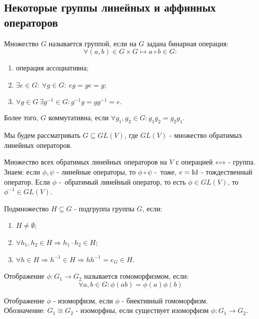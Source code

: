 \subsection{Некоторые группы линейных и аффинных операторов}
\begin{definition}
    Множество $G$ называется группой, если на $G$ задана бинарная операция:
    \[\forall (a,b) \in G \times G \longmapsto  a \circ b \in G:\]
    \begin{enumerate}
        \item операция ассоциативна;
        \item $\exists e \in G: \ \forall g \in G: \ eg = ge = g$;
        \item $\forall g \in G \ \exists g^{-1} \in G: g^{-1}g = gg^{-1} = e.$
    \end{enumerate}
    Более того, $G$ коммутативна, если $\forall g_1, g_2 \in G: g_1g_2 = g_2g_1$.
\end{definition}
Мы будем рассматривать $G \subseteq GL(V)$, где $GL(V)$ - множество обратимых линейных операторов.
\begin{example1}
    Множество всех обратимых линейных операторов на $V$ с операцией «$\circ$» - группа.\\
    Знаем: если $\phi, \psi$ - линейные операторы, то $\phi \circ \psi$ - тоже, $e = \textup{Id}$ - тождественный оператор. Если $\phi$ - обратимый линейный оператор, то есть $\phi \in GL(V)$, то $\phi^{-1} \in GL(V)$.
\end{example1}
\begin{definition}
    Подмножество $H \subseteq G$ - подгруппа группы $G$, если:
    \begin{enumerate}
        \item $H \neq \emptyset$;
        \item $\forall h_1, h_2 \in H \Longrightarrow h_1 \cdot h_2 \in H$;
        \item $\forall h \in H \Longrightarrow h^{-1} \in H \Longrightarrow h h^{-1} = e_G \in H$.
    \end{enumerate}
\end{definition} 
\begin{definition}
    Отображение $\phi: G_1 \to G_2$ называется гомоморфизмом, если: 
    $$\forall a,b \in G: \phi(ab) = \phi(a)\phi(b)$$
\end{definition} 
\begin{definition}
    Отображение $\phi$ - изоморфизм, если $\phi$ - биективный гомоморфизм.\\
    Обозначение: $G_1 \cong G_2$ - изоморфны, если существует изоморфизм $\phi: G_1 \to G_2$.
\end{definition} 

